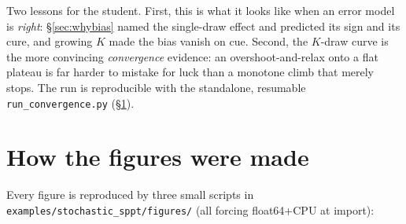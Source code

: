 \documentclass[11pt]{article}
\newcommand{\code}[1]{\texttt{#1}}
\begin{document}
Two lessons for the student. First, this is what it looks like when an error model
is \emph{right}: \S\ref{sec:whybias} named the single-draw effect and predicted its
sign and its cure, and growing $K$ made the bias vanish on cue. Second, the
$K$-draw curve is the more convincing \emph{convergence} evidence: an
overshoot-and-relax onto a flat plateau is far harder to mistake for luck than a
monotone climb that merely stops. The run is reproducible with the standalone,
resumable \code{run\_convergence.py} (\S\ref{sec:repro}).

\section{How the figures were made}\label{sec:repro}

Every figure is reproduced by three small scripts in
\code{examples/stochastic\_sppt/figures/} (all forcing float64+CPU at import):
\end{document}

